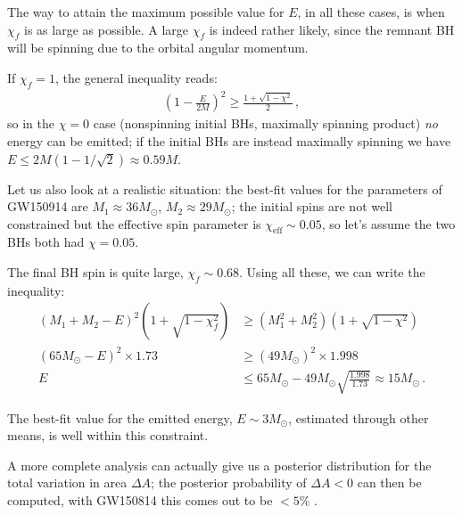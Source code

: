 \documentclass[main.tex]{subfiles}
\begin{document}
The way to attain the maximum possible value for \(E\), in all these cases, is when \(\chi _f\) is as large as possible. 
A large \(\chi _f\) is indeed rather likely, since the remnant BH will be spinning due to the orbital angular momentum. 

If \(\chi _f = 1\), the general inequality reads: 
%
\begin{align}
\left(1 - \frac{E}{2M}\right)^2 \geq \frac{1 + \sqrt{1 - \chi^2}}{2} 
\,,
\end{align}
%
so in the \(\chi = 0\) case (nonspinning initial BHs, maximally spinning product) \emph{no} energy can be emitted; if the initial BHs are instead maximally spinning we have \(E \leq 2M ( 1 - 1/\sqrt{2}) \approx 0.59 M\).

Let us also look at a realistic situation: the best-fit values for the parameters of GW150914 are \(M_1 \approx 36M_{\odot}\), \(M_2 \approx 29M_{\odot}\); the initial spins are not well constrained but the effective spin parameter is \(\chi _{\text{eff}} \sim 0.05\), so let's assume the two BHs both had \(\chi = 0.05\). 

The final BH spin is quite large, \(\chi _f \sim 0.68\). 
Using all these, we can write the inequality: %
\begin{align}
(M_1 + M_2 - E)^2 \left(1 + \sqrt{1 - \chi_f^2}\right) &\geq (M_1^2 + M_2^2 ) \left(1 + \sqrt{1 - \chi^2}\right)  \\
(65 M_{\odot} - E)^2 \times 1.73 &\geq (49 M_{\odot})^2 \times 1.998  \\
E &\leq 65M_{\odot} - 49 M_{\odot} \sqrt{\frac{1.998}{1.73}} \approx 15 M_{\odot}
\,.
\end{align}

The best-fit value for the emitted energy, \(E \sim 3M_{\odot}\), estimated through other means, is well within this constraint.

A more complete analysis can actually give us a posterior distribution for the total variation in area \(\Delta A\); the posterior probability of \(\Delta A < 0\) can then be computed, with GW150814 this comes out to be \(< 5\%\) \cite{isiTestingBlackholeArea2021}.
\end{document}
